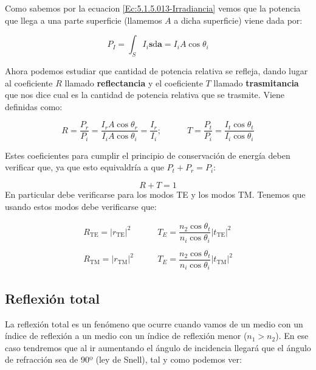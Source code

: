 \documentclass[12pt]{article}
\newcommand{\D}{\mathrm{d}}
\newcommand{\tquad}{\quad \quad \quad}
\newcommand{\TE}{\mathrm{TE}}
\newcommand{\TM}{\mathrm{TM}}
\newcommand{\an}{\mathbf{a}}
\newcommand{\sn}{\mathbf{s}}
\numberwithin{equation}{section}
\numberwithin{figure}{section}
\begin{document}
Como sabemos por la ecuacion \ref{Ec:5.1.5.013-Irradiancia} vemos que la potencia que llega a una parte superficie (llamemos $A$ a dicha superficie) viene dada por:

\begin{equation}
P_I = \int_S I_i \sn \D \an = I_i A \cos \theta_i
\end{equation}

Ahora podemos estudiar que cantidad de potencia relativa se refleja, dando lugar al coeficiente $R$ llamado \textbf{reflectancia} y el coeficiente $T$ llamado \textbf{trasmitancia} que nos dice cual es la cantidad de potencia relativa que se trasmite. Viene definidas como:

\begin{equation}
R = \dfrac{P_r}{P_i} = \dfrac{I_r A \cos \theta_r}{I_i A \cos \theta_i} = \dfrac{I_r}{I_i}; \tquad T = \dfrac{P_t}{P_i} = \dfrac{I_t \cos \theta_t}{I_i \cos \theta_i}
\end{equation}

Estes coeficientes para cumplir el principio de conservación de energía deben verificar que, ya que esto equivaldría a que $P_t+P_r=P_i$:

\begin{equation}
R+T =1
\end{equation}
En particular debe verificarse para los modos TE y los modos TM. Tenemos que usando estos modos debe verificarse que:

\begin{equation}
\begin{array}{ll}
R_{\TE} = |r_{\TE}|^2 \quad & \quad T_E = \dfrac{n_2 \cos \theta_t}{n_i \cos \theta_i} |t_{\TE}|^2 \\ \\
R_{\TM} = |r_{\TM}|^2 \quad & \quad T_E = \dfrac{n_2 \cos \theta_t}{n_i \cos \theta_i} |t_{\TM}|^2
\end{array}
\end{equation}

\subsection{Reflexión total}

La reflexión total es un fenómeno que ocurre cuando vamos de un medio con un índice de reflexión a un medio con un índice de reflexión menor ($n_1>n_2$). En ese caso tendremos que al ir aumentando el ángulo de incidencia llegará que el ángulo de refracción sea de 90º (ley de Snell), tal y como podemos ver:
\end{document}
